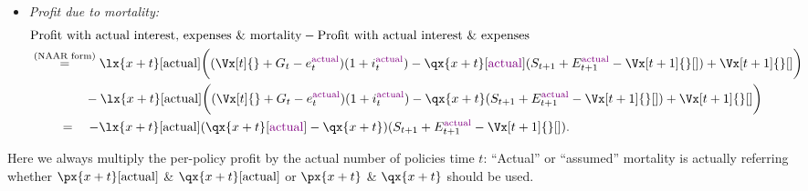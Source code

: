 \begin{enumerate}
\begin{itemize}
\item \emph{Profit due to mortality:}
\begin{align*}
&\text{Profit with actual interest,  expenses \& mortality}
-\text{Profit with actual interest \& expenses} \\
&\overset{\text{(NAAR form)}}{=}\lx{x+t}[\mathrm{actual}]\bigg(
(\Vx[t]{}+G_t-e_t^{\vc{\mathrm{actual}}})(1+i_t^{\vc{\mathrm{actual}}})
-\qx{x+t}[\vc{\mathrm{actual}}](S_{t+1}+E_{t+1}^{\vc{\mathrm{actual}}}-\Vx[t+1]{}[])
+\Vx[t+1]{}[]\bigg) \\
&\hspace{1.5cm}-\lx{x+t}[\mathrm{actual}]\bigg(
(\Vx[t]{}+G_t-e_t^{\vc{\mathrm{actual}}})(1+i_t^{\vc{\mathrm{actual}}})
-\qx{x+t}(S_{t+1}+E_{t+1}^{\vc{\mathrm{actual}}}-\Vx[t+1]{}[])
+\Vx[t+1]{}[]\bigg) \\
&\hspace{0.8cm}=\quad-\lx{x+t}[\mathrm{actual}](\qx{x+t}[\vc{\mathrm{actual}}]-\qx{x+t})(S_{t+1}+E_{t+1}^{\vc{\mathrm{actual}}}-\Vx[t+1]{}[]).
\end{align*}
\end{itemize}
\begin{note}
Here we always multiply the per-policy profit by the actual number of policies
 time \(t\): ``Actual'' or ``assumed'' mortality is actually
referring whether \(\px{x+t}[\mathrm{actual}]\) \&
\(\qx{x+t}[\mathrm{actual}]\) or \(\px{x+t}\) \& \(\qx{x+t}\) should be used.
\end{note}
\end{enumerate}
